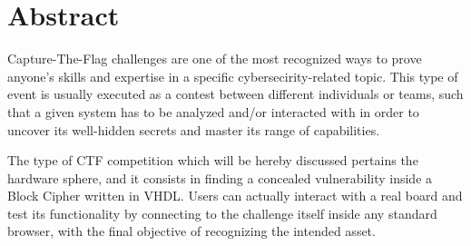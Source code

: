 \chapter*{Abstract}
Capture-The-Flag challenges are one of the most recognized ways to prove anyone's skills and expertise in a specific cybersecirity-related topic.
This type of event is usually executed as a contest between different individuals or teams, such that a given system has to be analyzed and/or interacted with in order to uncover its well-hidden secrets and master its range of capabilities.

The type of CTF competition which will be hereby discussed pertains the hardware sphere, and it consists in finding a concealed vulnerability inside a Block Cipher written in VHDL.
Users can actually interact with a real board and test its functionality by connecting to the challenge itself inside any standard browser, with the final objective of recognizing the intended asset.